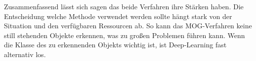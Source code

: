 \documentclass[conference]{IEEEtran}
\begin{document}
	Zusammenfassend lässt sich sagen das beide Verfahren ihre Stärken haben. Die Entscheidung welche Methode verwendet werden sollte hängt stark von der Situation und den verfügbaren Ressourcen ab. So kann das MOG-Verfahren keine still stehenden Objekte erkennen, was zu großen Problemen führen kann. Wenn die Klasse des zu erkennenden Objekts wichtig ist, ist Deep-Learning fast alternativ los.
	
	\printbibliography
	
	
\end{document}
